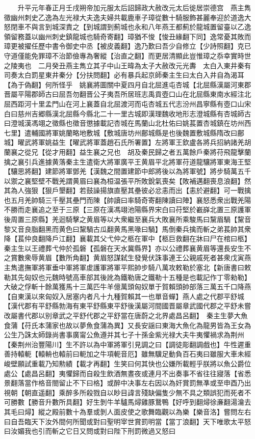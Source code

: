 　　升平元年春正月壬戌朔帝加元服太后詔歸政大赦改元太后徙居崇德宫　燕主雋徵幽州刺史乙逸為左光禄大夫逸夫婦共載鹿車子璋從數十騎服飾甚麗奉迎於道逸大怒閉車不與言到城深責之【到城謂到薊城也永和八年燕王都薊於龍城置留臺以乙逸領留務蓋以幽州刺史鎮龍城也騎奇寄翻】璋猶不悛【悛丑緣翻下同】逸常憂其敗而璋更被擢任歷中書令御史中丞【被皮義翻】逸乃歎曰吾少自修立【少詩照翻】克已守道僅能免罪璋不治節儉專為奢縱【治直之翻】而更居清顯此豈惟璋之忝幸實時世之陵夷也　二月癸丑燕主雋立其子中山王暐為太子大赦改元光夀　太白入東井秦有司奏太白罰星東井秦分【分扶問翻】必有暴兵起京師秦主生曰太白入井自為渴耳【為于偽翻】何所怪乎　姚襄將圖關中夏四月自北屈進屯杏城【北屈縣漢屬河東郡晋屬平陽郡師古曰屈吾勿翻晋公子夷吾所居班志禹貢壺口山在北屈縣東南水經注北屈西距河十里孟門山在河上襄蓋自北屈渡河而屯杏城五代志汾州昌寧縣有壺口山宋白曰慈州吉郷縣漢北屈縣今縣北二十一里古城即漢理魏收地形志澄城縣有杏城師古曰澄城漢馮翊之徵縣也徵音懲據載記杏城在馬蘭山北杜佑曰姚萇置杏城鎮在坊州西七里】遣輔國將軍姚蘭略地敷城【敷城唐坊州鄜城縣是也後魏置敷城縣隋改曰鄜城】曜武將軍姚益生【曜武將軍蓋趙石氏所署置】左將軍王欽盧各將兵招納諸羌胡蘭襄之從兄【從才用翻】益生襄之兄也　胡及秦民歸之者五萬餘戶秦將苻飛龍擊蘭擒之襄引兵進據黄落秦主生遣衛大將軍廣平王黄眉平北將軍苻道龍驤將軍東海王堅【驤思將翻】建節將軍鄧羌【漢魏之間置建節中郎將後以為將軍號】將步騎萬五千以禦之襄堅壁不戰羌謂黄眉曰襄為桓温張平所敗銳氣喪矣【敗補邁翻喪息浪翻】然其為人強狠【狠戶墾翻】若鼓譟揚旗直壓其壘彼必忿恚而出【恚於避翻】可一戰擒也五月羌帥騎三千壓其壘門而陳【帥讀曰率騎奇寄翻陳讀曰陣】襄怒悉衆出戰羌陽不勝而走襄追之至于三原【三原在漢馮翊池陽縣界宋白曰苻堅於嶻嶭北置三原護軍後周置三原縣】羌迴騎擊之黄眉等以大衆繼至襄兵大敗襄所乘駿馬曰黧眉騧【黧音黎又音良脂翻黑而黄色曰黧騧古瓜翻黄馬黑喙曰騧】馬倒秦兵擒而斬之弟萇帥其衆降【萇仲良翻降戶江翻】襄載其父弋仲之柩在軍中【柩巨救翻在牀曰尸在棺曰柩】秦主生以王禮葬弋仲於孤磐【孤磐在天水冀縣界】亦以公禮葬襄黄眉等還長安生不之賞數衆辱黄眉【數所角翻】黄眉怒謀弑生發覺伏誅事連王公親戚死者甚衆戊寅燕主雋遣撫軍將軍垂中軍將軍䖍護軍將軍平熙帥步騎八萬攻敕勒於塞北【新唐書曰敕勒其先匈奴也元魏時號高車部其後訛為鐵勒唐之鐵勒十五種是也載記作丁零勑勒】大破之俘斬十餘萬獲馬十三萬匹牛羊億萬頭匈奴單于賀賴頭帥部落三萬五千口降燕【自東漢以來匈奴入居塞内者凡十九種賀賴其一也單音蟬】燕人處之代郡平舒城【漢代郡有平舒縣勃海有東平舒縣東平舒後漢屬河間國晋屬章武國代郡之平舒未嘗改屬書代郡以别章武之平舒代郡之平舒當在唐蔚之北界處昌呂翻】　秦主生夢大魚食蒲【苻氏本蒲家也故以夢魚食蒲為異】又長安謡曰東海大魚化為龍男皆為王女為公生乃誅太師錄尚書事廣甯公魚遵并其七子十孫金紫光禄大夫牛夷懼禍求為荆州【秦荆州治豐陽川】生不許以為中軍將軍引見調之曰【調徒彫翻調戲也】牛性遲重善持轅軛【轅輈也轅前曰軛加之牛項軛音厄】雖無驥足動負百石夷曰雖服大車未經峻壁願試重載乃知勲績【載才再翻】生笑曰何其快也公嫌所載輕乎朕將以魚公爵位處公【處昌呂翻】夷懼歸而自殺生飲酒無晝夜或連月不出奏事不省往往寢落【省悉景翻落當作格音閤留止不下曰格】或醉中决事左右因以為奸賞罰無凖或至申酉乃出視朝【朝直遥翻】乘醉多所殺戮自以眇目諱言殘缺偏隻少無不具之類誤犯而死者不可勝數【勝音升數所具翻】好生剝牛羊驢馬燖雞豚鵞鴨【好呼到翻燖徐亷翻湯瀹去其毛曰燖】縱之殿前數十為羣或剝人面皮使之歌舞臨觀以為樂【樂音洛】嘗問左右曰自吾臨天下汝外間何所聞或對曰聖明宰世賞罰明當【當丁浪翻】天下唯歌太平怒曰汝媚我也引而斬之它日又問或對曰陛下刑罰微過又怒曰
